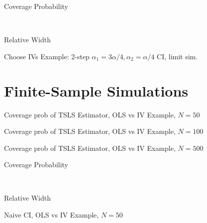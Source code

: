 \documentclass[12pt,letterpaper]{article}
\begin{document}
\begin{table}[h]
  \centering
  \begin{subtable}{0.48\textwidth}
    \caption{Coverage Probability}
    
  \end{subtable}
  ~
  \begin{subtable}{0.48\textwidth}
    \caption{Relative Width}
    
  \end{subtable}
  \label{tab:Limit2StepNarrowTauChooseIVs}
  \caption{Choose IVs Example: 2-step $\alpha_1 = 3\alpha/4,  \alpha_2 = \alpha/4$ CI, limit sim.}
\end{table}



\section{Finite-Sample Simulations}


\begin{table}[h]
  \centering
  
  \label{tab:CISim50TSLS_OLSvsIV}
  \caption{Coverage prob of TSLS Estimator, OLS vs IV Example, $N=50$}
\end{table}

\begin{table}[h]
  \centering
  
  \label{tab:CISim100TSLS_OLSvsIV}
  \caption{Coverage prob of TSLS Estimator, OLS vs IV Example, $N=100$}
\end{table}

\begin{table}[h]
  \centering
  
  \label{tab:CISim500TSLS_OLSvsIV}
  \caption{Coverage prob of TSLS Estimator, OLS vs IV Example, $N=500$}
\end{table}





\begin{table}[h]
  \centering
  \begin{subtable}{0.48\textwidth}
    \caption{Coverage Probability}
    
  \end{subtable}
  ~
  \begin{subtable}{0.48\textwidth}
    \caption{Relative Width}
    
  \end{subtable}
  \label{tab:CISim50Naive_OLSvsIV}
  \caption{Naive CI, OLS vs IV Example, $N=50$}
\end{table}
\end{document}
